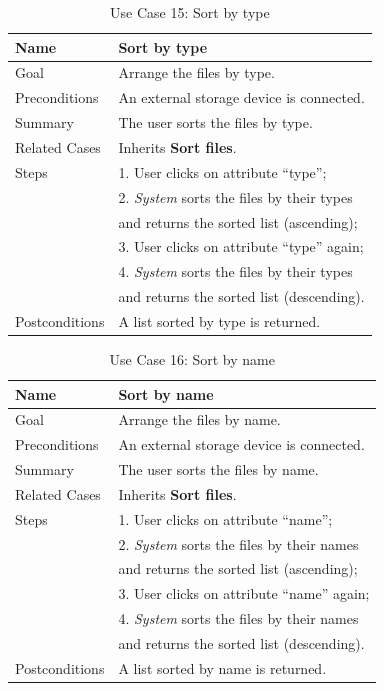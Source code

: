 \begin{table}[h!]
\centering
\begin{tabular}{|l|l|}
\hline
Name & Sort by type\\ \hline
Goal & Arrange the files by type.\\ \hline
Preconditions & An external storage device is connected. \\ \hline
Summary & The user sorts the files by type.\\ \hline
Related Cases & Inherits \textbf{Sort files}. \\ \hline
Steps &  1. User clicks on attribute ``type''; \\
      &  2. \textit{System} sorts the files by their types 
      \\ & and returns the sorted list (ascending); \\
      &  3. User clicks on attribute ``type'' again; \\
      &  4. \textit{System} sorts the files by their types
      \\ & and returns the sorted list (descending).
        \\ \hline
Postconditions & A list sorted by type is returned.
\\ \hline
\end{tabular}
\caption{Use Case 15: Sort by type}
\label{tab:UC15}
\end{table}

\begin{table}[h!]
\centering
\begin{tabular}{|l|l|}
\hline
Name & Sort by name\\ \hline
Goal & Arrange the files by name.\\ \hline
Preconditions & An external storage device is connected. \\ \hline
Summary & The user sorts the files by name.\\ \hline
Related Cases & Inherits \textbf{Sort files}. \\ \hline
Steps &  1. User clicks on attribute ``name''; \\
      &  2. \textit{System} sorts the files by their names
      \\ & and returns the sorted list (ascending); \\
      &  3. User clicks on attribute ``name'' again; \\
      &  4. \textit{System} sorts the files by their names
      \\ & and returns the sorted list (descending).
        \\ \hline
Postconditions & A list sorted by name is returned.
\\ \hline
\end{tabular}
\caption{Use Case 16: Sort by name}
\label{tab:UC16}
\end{table}

